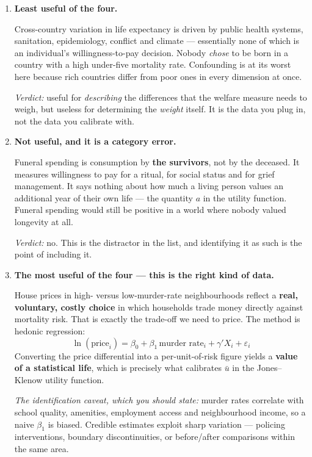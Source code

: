 \documentclass[12pt, letterpaper]{article}
\begin{document}
\begin{tcolorbox}[oddbox,title={Problem 2.5 \quad Measuring the Value of Life Expectancy}]
\begin{enumerate}
\emph{Verdict:} suggestive, not identifying. Would need an income shock unrelated to health
--- a lottery win, an inheritance, a pension reform --- to be usable.

\item \textbf{Least useful of the four.}

Cross-country variation in life expectancy is driven by public health systems, sanitation,
epidemiology, conflict and climate --- essentially none of which is an individual's
willingness-to-pay decision. Nobody \emph{chose} to be born in a country with a high
under-five mortality rate. Confounding is at its worst here because rich countries differ
from poor ones in every dimension at once.

\emph{Verdict:} useful for \emph{describing} the differences that the welfare measure needs
to weigh, but useless for determining the \emph{weight} itself. It is the data you plug in,
not the data you calibrate with.

\item \textbf{Not useful, and it is a category error.}

Funeral spending is consumption by \textbf{the survivors}, not by the deceased. It measures
willingness to pay for a ritual, for social status and for grief management. It says nothing
about how much a living person values an additional year of their own life --- the quantity
$a$ in the utility function. Funeral spending would still be positive in a world where nobody
valued longevity at all.

\emph{Verdict:} no. This is the distractor in the list, and identifying it as such is the
point of including it.

\item \textbf{The most useful of the four --- this is the right kind of data.}

House prices in high- versus low-murder-rate neighbourhoods reflect a \textbf{real,
voluntary, costly choice} in which households trade money directly against mortality risk.
That is exactly the trade-off we need to price. The method is hedonic regression:
$$\ln(\text{price}_i) = \beta_0 + \beta_1\,\text{murder rate}_i + \gamma' X_i + \varepsilon_i$$
Converting the price differential into a per-unit-of-risk figure yields a \textbf{value of a
statistical life}, which is precisely what calibrates $\bar u$ in the Jones--Klenow utility
function.

\emph{The identification caveat, which you should state:} murder rates correlate with school
quality, amenities, employment access and neighbourhood income, so a naive $\beta_1$ is
biased. Credible estimates exploit sharp variation --- policing interventions, boundary
discontinuities, or before/after comparisons within the same area.


\end{enumerate}
\end{tcolorbox}
\end{document}
